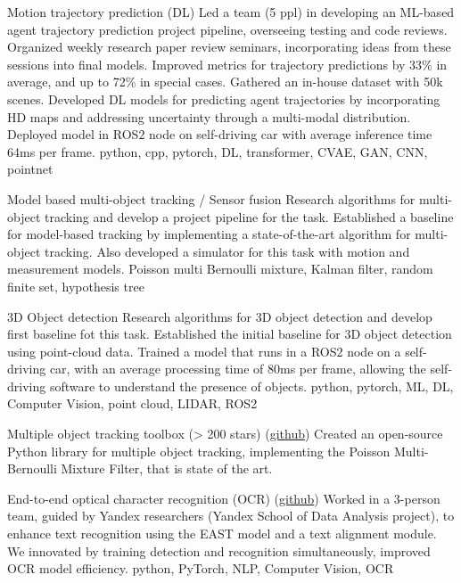 \documentclass[]{resume}
\begin{document}
\project
{Motion trajectory prediction (DL)}
{Led a team (5 ppl) in developing an ML-based agent trajectory prediction project pipeline, overseeing testing and code reviews. Organized weekly research paper review seminars, incorporating ideas from these sessions into final models.}
{Improved metrics for trajectory predictions by 33\% in average, and up to 72\% in special cases. Gathered an in-house dataset with 50k scenes. Developed DL models for predicting agent trajectories by incorporating HD maps and addressing uncertainty through a multi-modal distribution. Deployed model in ROS2 node on self-driving car with average inference time 64ms per frame.}
{python, cpp, pytorch, DL, transformer, CVAE, GAN, CNN, pointnet}

\project
{Model based multi-object tracking / Sensor fusion}
{Research algorithms for multi-object tracking and develop a project pipeline for the task.}
{Established a baseline for model-based tracking by implementing a state-of-the-art algorithm for multi-object tracking. Also developed a simulator for this task with motion and measurement models.}
{Poisson multi Bernoulli mixture, Kalman filter, random finite set, hypothesis tree}

\project
{3D Object detection}
{Research algorithms for 3D object detection and develop first baseline fot this task.}
{Established the initial baseline for 3D object detection using point-cloud data. Trained a model that runs in a ROS2 node on a self-driving car, with an average processing time of 80ms per frame, allowing the self-driving software to understand the presence of objects.}
{python, pytorch, ML, DL, Computer Vision, point cloud, LIDAR, ROS2}

\par \noindent
{}
\project
{Multiple object tracking toolbox (> 200 stars) (\href{https://github.com/neer201/Multi-Object-Tracking-for-Automotive-Systems-in-python}{github})}
{}
{Created an open-source Python library for multiple object tracking, implementing the Poisson Multi-Bernoulli Mixture Filter, that is state of the art.}
{}


\project
{End-to-end optical character recognition (OCR) (\href{https://github.com/kharitonov-ivan/end2end_OCR}{github})}
{}
{Worked in a 3-person team, guided by Yandex researchers (Yandex School of Data Analysis project), to enhance text recognition using the EAST model and a text alignment module. We innovated by training detection and recognition simultaneously, improved OCR model efficiency.}
{python, PyTorch, NLP, Computer Vision, OCR}
\end{document}
